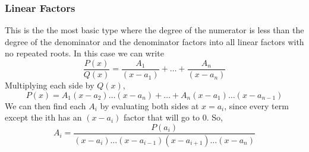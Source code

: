 \subsubsection{Linear Factors}
\noindent
This is the the most basic type where the degree of the numerator is less than the degree of the denominator and the denominator factors into all linear factors with no repeated roots. In this case we can write
\begin{equation*}
	\frac{P(x)}{Q(x)} = \frac{A_1}{(x-a_1)} + \ldots + \frac{A_n}{(x-a_n)}
\end{equation*}
Multiplying each side by $Q(x)$,
\begin{equation*}
	P(x) = A_1(x-a_2) \ldots (x-a_n) + \ldots + A_n(x-a_1) \ldots (x-a_{n-1})
\end{equation*}
We can then find each $A_i$ by evaluating both sides at $x=a_i$, since every term except the ith has an $(x-a_i)$ factor that will go to 0. So,
\begin{equation*}
	A_i = \frac{P(a_i)}{(x-a_i) \ldots (x-a_{i-1})(x-a_{i+1}) \ldots (x-a_n)}
\end{equation*}

